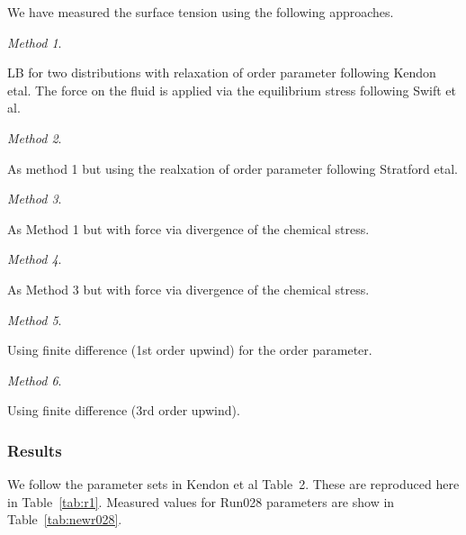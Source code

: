 We have measured the surface tension using the following approaches.

\textit{Method 1}.

LB for two distributions with relaxation of order parameter
following Kendon etal. The force on the fluid is applied
via the equilibrium stress following Swift et al.

\textit{Method 2}.

As method 1 but using the realxation of order parameter
following Stratford etal.

\textit{Method 3}.

As Method 1 but with force via divergence of the chemical stress.

\textit{Method 4}.

As Method 3 but with force via divergence of the chemical stress.

\textit{Method 5}.

Using finite difference (1st order upwind) for the order parameter.

\textit{Method 6}.

Using finite difference (3rd order upwind).

\subsubsection{Results}

We follow the parameter sets in Kendon et al Table~2. These
are reproduced here in Table~\ref{tab:r1}. Measured values for
Run028 parameters are show in Table~\ref{tab:newr028}.

